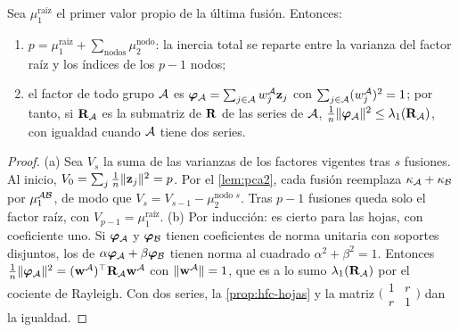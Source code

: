 \begin{proposicion}\label{prop:hfc-inercia}
Sea $\mu_1^{\text{raíz}}$ el primer valor propio de la última fusión. Entonces:
\begin{enumerate}[label=(\alph*)]
  \item $p=\mu_1^{\text{raíz}}+\sum_{\text{nodos}}\mu_2^{\text{nodo}}$: la inercia total se
    reparte entre la varianza del factor raíz y los índices de los $p-1$ nodos;
  \item el factor de todo grupo $\mathcal{A}$ es $\boldsymbol{\varphi}_{\mathcal{A}}=\sum_{j\in\mathcal{A}}w^{\mathcal{A}}_j\mathbf{z}_j$ con
    $\sum_{j\in\mathcal{A}}(w^{\mathcal{A}}_j)^2=1$; por tanto, si $\mathbf{R}_{\mathcal{A}}$ es la submatriz de $\mathbf{R}$ de
    las series de $\mathcal{A}$, $\frac1n\lVert \boldsymbol{\varphi}_{\mathcal{A}}\rVert^2\le\lambda_1(\mathbf{R}_{\mathcal{A}})$, con igualdad cuando
    $\mathcal{A}$ tiene dos series.
\end{enumerate}
\end{proposicion}

\begin{proof}
(a) Sea $V_s$ la suma de las varianzas de los factores vigentes tras $s$ fusiones. Al inicio,
$V_0=\sum_j\frac1n\lVert \mathbf{z}_j\rVert^2=p$. Por el \cref{lem:pca2}, cada fusión reemplaza
$\kappa_{\mathcal{A}}+\kappa_{\mathcal{B}}$ por $\mu_1^{\mathcal{A}\mathcal{B}}$, de modo que $V_{s}=V_{s-1}-\mu_2^{\text{nodo }s}$.
Tras $p-1$ fusiones queda solo el factor raíz, con $V_{p-1}=\mu_1^{\text{raíz}}$.
(b) Por inducción: es cierto para las hojas, con coeficiente uno. Si $\boldsymbol{\varphi}_{\mathcal{A}}$ y $\boldsymbol{\varphi}_{\mathcal{B}}$
tienen coeficientes de norma unitaria con soportes disjuntos, los de
$\alpha\boldsymbol{\varphi}_{\mathcal{A}}+\beta\boldsymbol{\varphi}_{\mathcal{B}}$ tienen norma al cuadrado $\alpha^2+\beta^2=1$. Entonces
$\frac1n\lVert \boldsymbol{\varphi}_{\mathcal{A}}\rVert^2=(\mathbf{w}^{\mathcal{A}})^{\top}\mathbf{R}_{\mathcal{A}}\mathbf{w}^{\mathcal{A}}$ con
$\lVert \mathbf{w}^{\mathcal{A}}\rVert=1$, que es a lo sumo $\lambda_1(\mathbf{R}_{\mathcal{A}})$ por el cociente de Rayleigh.
Con dos series, la \cref{prop:hfc-hojas} y la matriz $\bigl(\begin{smallmatrix}1&r\\r&1
\end{smallmatrix}\bigr)$ dan la igualdad.
\end{proof}

